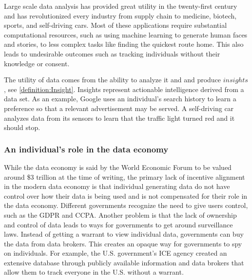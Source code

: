 Large scale data analysis has provided great utility in the twenty-first century and has revolutionized every industry from supply chain to medicine, 
biotech, sports, and self-driving cars. Most of these applications require substantial computational resources, such as using machine learning to 
generate human faces and stories, to less complex tasks like finding the quickest route home. This also leads to undesirable outcomes such as 
tracking individuals without their knowledge or consent. 

The utility of data comes from the ability to analyze it and and produce $\mathit{insights}$, see \ref{definition:Insight}. Insights represent actionable intelligence 
derived from a data set. As an example, Google uses an individual's search history to learn a preference so that a relevant advertisement may be served. A self-driving 
car analyzes data from its sensors to learn that the traffic light turned red and it should stop.

\subsubsection{An individual's role in the data economy} 

While the data economy is said by the World Economic Forum to be valued around \$3 trillion at the time of writing, the primary lack of incentive alignment 
in the modern data economy is that individual generating data do not have control over how their data is being used and is not compensated for their role 
in the data economy. Different governments recognize the need to give users control, such as the GDPR and CCPA. 
 Another problem is that the lack of ownership and control of data leads to ways for governments to get around surveillance laws. Instead 
of getting a warrant to view individual data, governments can buy the data from data brokers. This creates an opaque way for governments to spy on individuals. 
For example, the U.S. government’s ICE agency created an extensive database through publicly available information and data brokers that allow them to track 
everyone in the U.S. without a warrant.


